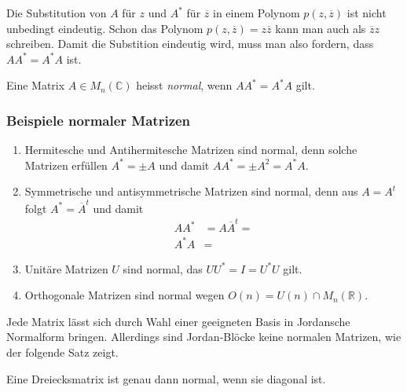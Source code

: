 Die Substitution von $A$ für $z$ und $A^*$ für $\overline{z}$
in einem Polynom $p(z,\overline{z})$ ist nicht unbedingt eindeutig.
Schon das Polynom $p(z,\overline{z})=z\overline{z}$ kann man auch
als $\overline{z}z$ schreiben.
Damit die Substition eindeutig wird, muss man also fordern, dass
$AA^* = A^*A$ ist.

\begin{definition}
Eine Matrix $A\in M_n(\mathbb{C})$ heisst {\em normal}, wenn $AA^*=A^*A$ gilt.
%
\end{definition}

\subsubsection{Beispiele normaler Matrizen}

\begin{enumerate}
\item
Hermitesche und Antihermitesche Matrizen sind normal, denn solche
%
%
Matrizen erfüllen $A^*=\pm A$ und damit
\(
AA^* = \pm A^2 = A^*A.
\)
\item
Symmetrische und antisymmetrische Matrizen sind normal,
%
%
denn aus $A=A^t$ folgt $A^*=\overline{A}^t$ und damit
\begin{align*}
AA^* &=  A\overline{A}^t = 
\\
A^*A &=
\end{align*}
\item
Unitäre Matrizen $U$ sind normal, das $UU^*=I=U^*U$ gilt.
%
\item
Orthogonale Matrizen sind normal wegen $O(n) = U(n) \cap M_n(\mathbb{R})$.
%
\end{enumerate}

Jede Matrix lässt sich durch Wahl einer geeigneten Basis in Jordansche 
Normalform bringen.
Allerdings sind Jordan-Blöcke keine normalen Matrizen, wie der folgende
Satz zeigt.

\begin{satz}
Eine Dreiecksmatrix ist genau dann normal, wenn sie diagonal ist.
%
\end{satz}

